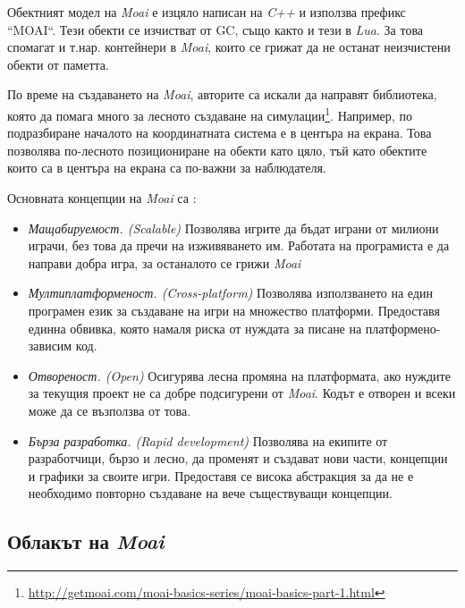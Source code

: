 		Обектният модел на \emph{Moai} е изцяло написан на \emph{C++} и използва префикс ``MOAI``. Тези обекти
		се изчистват от \ac{GC}, също както и тези в \emph{Lua}. За това спомагат и т.нар. контейнери в \emph{Moai},
		които се грижат да не останат неизчистени обекти от паметта.
		
		По време на създаването на \emph{Moai}, авторите са искали да направят библиотека, която да помага много
		за лесното създаване на симулации\footnote{\url{http://getmoai.com/moai-basics-series/moai-basics-part-1.html}}.
		Например, по подразбиране началото на координатната система е в центъра на екрана. Това позволява по-лесното
		позициониране на обекти като цяло, тъй като обектите които са в центъра на екрана са по-важни за наблюдателя.
		
		Основната концепции на \emph{Moai} са \cite{Zipline}:
		
		\begin{itemize}

			\item \emph{Мащабируемост. (Scalable)} Позволява игрите да бъдат играни от милиони играчи, без това
			да пречи на изживяването им. Работата на програмиста е да направи добра игра, за останалото се грижи
			\emph{Moai} 
			
			\item \emph{Мултиплатформеност. (Cross-platform)} Позволява използването на един програмен език за
			създаване на игри на множество платформи. Предоставя единна обвивка, която намаля риска от нуждата за
			писане на платформено-зависим код.
			
			\item \emph{Отвореност. (Open)} Осигурява лесна промяна на платформата, ако нуждите за текущия
			проект не са добре подсигурени от \emph{Moai}. Кодът е отворен и всеки може да се възползва от това.
			
			\item \emph{Бърза разработка. (Rapid development)} Позволява на екипите от разработчици, бързо и лесно, да
			променят и създават нови части, концепции и графики за своите игри. Предоставя се висока абстракция за да не е
			необходимо повторно създаване на вече съществуващи концепции.
			
		\end{itemize}
		
		\subsection{Облакът на \emph{Moai}}
		
